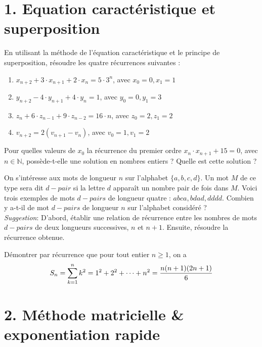 \newpage

\section*{1. Equation caractéristique et superposition}

\begin{exercise}
    En utilisant la méthode de l'équation caractéristique et le principe de superposition, résoudre les quatre récurrences suivantes :
    \begin{enumerate}
        \item $x_{n+2}+3\cdot x_{n+1}+2\cdot x_{n}=5\cdot 3^n$, avec $x_0=0,x_1=1$
        \item $y_{n+2}-4\cdot y_{n+1}+4\cdot y_{n}=1$, avec $y_0=0, y_1=3$
        \item $z_n+6\cdot z_{n-1}+9\cdot z_{n-2}=16\cdot n$, avec $z_0=2, z_1=2$
        \item $v_{n+2} = 2(v_{n+1}-v_n)$, avec $v_0=1,v_1=2$
    \end{enumerate}
\end{exercise}


\begin{exercise}
    Pour quelles valeurs de $x_0$ la récurrence du premier ordre $x_n\cdot x_{n+1}+15=0$, avec $n\in\mathbb{N}$, possède-t-elle une solution en nombres entiers ? Quelle est cette solution ?
\end{exercise}


\begin{exercise}
    On s'intéresse aux mots de longueur $n$ sur l'alphabet $\{a,b,c,d\}$. Un mot $M$ de ce type sera dit $d-pair$ si la lettre $d$ apparaît un nombre pair de fois dans $M$. Voici trois exemples de mots $d-pairs$ de longueur quatre : $abca,bdad,dddd$. Combien y a-t-il de mot $d-pairs$ de longueur $n$ sur l'alphabet considéré ?\\ \textit{Suggestion}: D'abord, établir une relation de récurrence entre les nombres de mots $d-pairs$ de deux longueurs successives, $n$ et $n+1$. Ensuite, résoudre la récurrence obtenue.
\end{exercise}


\begin{exercise}
    Démontrer par récurrence que pour tout entier $n\geq 1$, on a 
    $$S_n = \displaystyle\sum_{k=1}^{n}k^2=1^2+2^2+\cdots+n^2=\frac{n(n+1)(2n+1)}{6}$$
\end{exercise}


\section*{2. Méthode matricielle \& exponentiation rapide}

